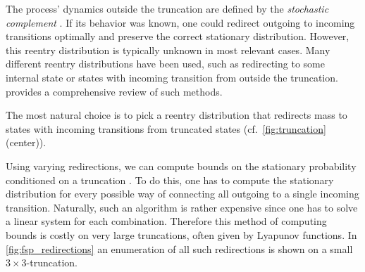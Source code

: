 The process' dynamics outside the truncation are defined by the \emph{stochastic complement} \parencite{spieler2014numerical}.
If its behavior was known, one could redirect outgoing to incoming transitions optimally and preserve the correct stationary distribution.
However, this reentry distribution is typically unknown in most relevant cases.
Many different reentry distributions have been used, such as redirecting to some internal state or states with incoming transition from outside the truncation.
\citet{kuntz2021approximations} provides a comprehensive review of such methods.

The most natural choice is to pick a reentry distribution that redirects mass to states with incoming transitions from truncated states (cf.\ \autoref{fig:truncation} (center)).

Using varying redirections, we can compute bounds on the stationary probability conditioned on a truncation \parencite[Thm.~14]{spieler2014numerical}.
To do this, one has to compute the stationary distribution for every possible way of connecting all outgoing to a single incoming transition.
Naturally, such an algorithm is rather expensive since one has to solve a linear system for each combination.
Therefore this method of computing bounds is costly on very large truncations, often given by Lyapunov functions.
In \autoref{fig:fsp_redirections} an enumeration of all such redirections is shown on a small $3\times 3$-truncation.

